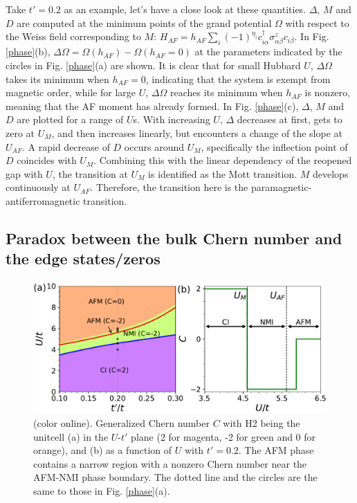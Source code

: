 \documentclass[12pt]{iopart}
\begin{document}
\par Take $t'=0.2$ as an example, let's have a close look at these quantities. $\Delta$, $M$ and $D$ are computed at the minimum points of the grand potential $\Omega$ with respect to the Weiss field corresponding to $M$: $H_{AF}=h_{AF}\sum_i(-1)^{\eta_i}c^\dagger_{i\alpha}\sigma^z_{\alpha\beta}c_{i\beta}$. In Fig. \ref{phase}(b), $\Delta\Omega=\Omega(h_{AF})-\Omega(h_{AF}=0)$ at the parameters indicated by the circles in Fig. \ref{phase}(a) are shown. It is clear that for small Hubbard $U$, $\Delta\Omega$ takes its minimum when $h_{AF}=0$, indicating that the system is exempt from magnetic order, while for large $U$, $\Delta\Omega$ reaches its minimum when $h_{AF}$ is nonzero, meaning that the AF moment has already formed. In Fig. \ref{phase}(c), $\Delta$, $M$ and $D$ are plotted for a range of $U$s. With increasing $U$, $\Delta$ decreases at first, gets to zero at $U_M$, and then increases linearly, but encounters a change of the slope at $U_{AF}$. A rapid decrease of $D$ occurs around $U_M$, specifically the inflection point of $D$ coincides with $U_M$. Combining this with the linear dependency of the reopened gap with $U$, the transition at $U_M$ is identified as the Mott transition. $M$ develops continuously at $U_{AF}$. Therefore, the transition here is the paramagnetic-antiferromagnetic transition.

\subsection{Paradox between the bulk Chern number and the edge states/zeros}\label{Paradox}

\begin{figure}
\centering
\includegraphics[scale=0.6]{h2chernnumber}
\caption{(color online). Generalized Chern number $C$ with H2 being the unitcell (a) in the $U$-$t'$ plane (2 for magenta, -2 for green and 0 for orange), and (b) as a function of $U$ with $t'=0.2$. The AFM phase contains a narrow region with a nonzero Chern number near the AFM-NMI phase boundary. The dotted line and the circles are the same to those in Fig. \ref{phase}(a).}\label{h2chernnumber}
\end{figure}
\end{document}
